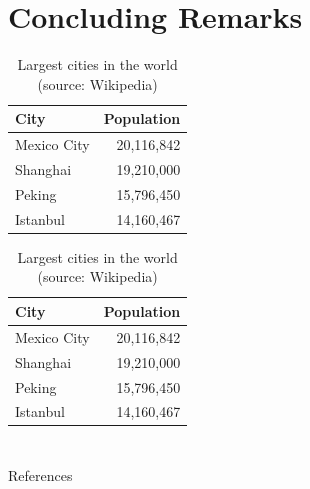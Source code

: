 \documentclass[
11pt,notheorems,compress,hyperref={pdfauthor=Maghfira Ramadhani}
]{beamer}
\begin{document}
\section{Concluding Remarks}
\begin{frame}
    \begin{table}
        \caption{Largest cities in the world (source: Wikipedia)}
        \begin{tabular}{@{} lr @{}}
          \toprule
          City & Population\\
          \midrule
          Mexico City & 20,116,842\\
          Shanghai & 19,210,000\\
          Peking & 15,796,450\\
          Istanbul & 14,160,467\\
          \bottomrule
        \end{tabular}
        \hspace*{1cm}
            \setlength\extrarowheight{3pt}
        \begin{tabular}{|lr|}
          \hline
          \rowcolor{primary}\color{white}City & \color{white}Population\\
          \hline
          Mexico City & 20,116,842\\
          Shanghai & 19,210,000\\
          Peking & 15,796,450\\
          Istanbul & 14,160,467\\
          \hline
        \end{tabular}
    \end{table}
\end{frame}

\section{}
\begin{frame}[allowframebreaks]{References}
    
    
\end{frame}
\end{document}
